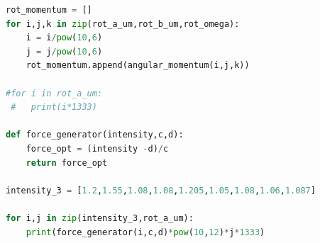 \documentclass[a4paper,english,12pt,bibliography=totoc]{scrreprt}
\begin{document}
\begin{lstlisting}[language=python, breaklines=true, breakatwhitespace=true, basicstyle=\footnotesize\ttfamily]
rot_momentum = []
for i,j,k in zip(rot_a_um,rot_b_um,rot_omega):
    i = i/pow(10,6)
    j = j/pow(10,6)
    rot_momentum.append(angular_momentum(i,j,k))

#for i in rot_a_um:
 #   print(i*1333)

def force_generator(intensity,c,d):
    force_opt = (intensity -d)/c
    return force_opt

intensity_3 = [1.2,1.55,1.08,1.08,1.205,1.05,1.08,1.06,1.087]

for i,j in zip(intensity_3,rot_a_um):
    print(force_generator(i,c,d)*pow(10,12)*j*1333)

\end{lstlisting}
\end{document}
